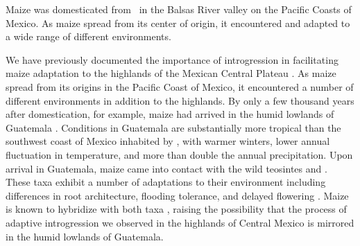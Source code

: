 Maize was domesticated from \zp\ in the Balsas River valley on the Pacific Coasts of Mexico.  
As maize spread from its center of origin, it encountered and adapted to a wide range of different environments.

We have previously documented the importance of introgression in facilitating maize adaptation to the highlands of the Mexican Central Plateau \citep{Hufford2013, Takuno15062015}.
As maize spread from its origins in the Pacific Coast of Mexico, it  encountered a number of different environments in addition to the highlands.
By only a few thousand years after domestication, for example, maize had arrived in the humid lowlands of Guatemala \citep{neff2006early}.  
Conditions in Guatemala are substantially more tropical than the southwest coast of Mexico inhabited by \zp, with warmer winters, lower annual fluctuation in temperature, and more than double the annual precipitation.
Upon arrival in Guatemala, maize came into contact with the wild teosintes \zh{} and \zl.  
These taxa exhibit a number of adaptations to their environment including differences in root architecture, flooding tolerance, and delayed flowering \citep{wilkes1967teosinte, mano2006}.
Maize is known to hybridize with both taxa \citep{wilkes1967teosinte}, raising the possibility that the process of adaptive introgression we observed in the highlands of Central Mexico is mirrored in the humid lowlands of Guatemala.

